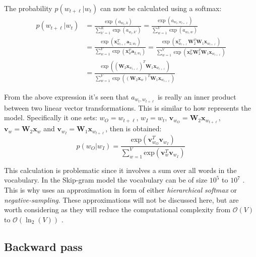 The probability $p(w_{t + \ell} | w_t)$ can now be calculated using a softmax:
\begin{equation}
\begin{aligned}
p(w_{t + \ell} | w_t)
&= \frac{\exp(a_{w_t,k})}{\sum_{k'=1}^K \exp(a_{w_t,k'})}
= \frac{\exp(a_{w_t, w_{t + \ell}})}{\sum_{w=1}^V \exp(a_{w_t, w})} \\
&= \frac{\exp( \mathbf{x}_{w_{t+\ell}}^T \mathbf{a}_{2,w_t} )}{\sum_{w=1}^V \exp(\mathbf{x}_{w}^T \mathbf{a}_{2,w_t})}
= \frac{
	\exp( \mathbf{x}_{w_{t+\ell}}^T \mathbf{W}_2^T \mathbf{W}_1 \mathbf{x}_{w_{t+\ell}})
}{
	\sum_{w=1}^V \exp(\mathbf{x}_{w}^T \mathbf{W}_2^T \mathbf{W}_1 \mathbf{x}_{w_{t+\ell}})
} \\
&= \frac{
	\exp( \left(\mathbf{W}_2 \mathbf{x}_{w_{t+\ell}} \right)^T \mathbf{W}_1 \mathbf{x}_{w_{t+\ell}})
}{
	\sum_{w=1}^V \exp( \left(\mathbf{W}_2 \mathbf{x}_{w}\right)^T \mathbf{W}_1 \mathbf{x}_{w_{t+\ell}})
}
\end{aligned}
\end{equation}

From the above expression it's seen that $a_{w_t, w_{t + \ell}}$ is really an inner product between two linear vector transformations. This is similar to how \cite{word2vec-details} represents the model. Specifically it one sets: $w_O = w_{t + \ell}$, $w_I = w_t$, $\mathbf{v}_{w_O} = \mathbf{W}_2 \mathbf{x}_{w_{t+\ell}}$, $\mathbf{v}_{w} = \mathbf{W}_2 \mathbf{x}_{w}$ and $\mathbf{v}_{w_I} = \mathbf{W}_1 \mathbf{x}_{w_{t + \ell}}$, then \cite[eq. 2]{word2vec-details} is obtained:
\begin{equation}
p(w_O | w_I) = \frac{
	\mathrm{exp}( \mathbf{v}_{w_O}^T \mathbf{v}_{w_I} )
}{
	\sum_{w=1}^V \mathrm{exp}( \mathbf{v}_{w}^T \mathbf{v}_{w_I} )
}
\end{equation}

This calculation is problematic since it involves a sum over all words in the vocabulary. In the Skip-gram model the vocabulary can be of size $10^5$ to $10^7$ \cite{word2vec-details}. This is why \cite{word2vec-comparing, word2vec-details, word2vec-explained} uses an approximation in form of either \textit{hierarchical softmax} or \textit{negative-sampling}. These approximations will not be discussed here, but are worth considering as they will reduce the computational complexity from $\mathcal{O}(V)$ to $\mathcal{O}(\ln_2(V))$ \cite{word2vec-comparing}.

\subsection{Backward pass}

